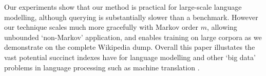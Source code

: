 Our experiments show that our method is practical for large-scale language
modelling, although querying is substantially slower than a \SRILM benchmark.
However our technique scales much more gracefully with Markov order $m$, allowing
unbounded `non-Markov' application, and enables training on large
corpora as we demonstrate on the complete Wikipedia dump.
Overall this paper illustates the vast potential succinct indexes have for language modelling  and
other `big data' problems in language processing such as machine translation 
\cite{zhang_vogel_2005,DBLP:conf/acl/Callison-BurchBS05,lopez2008,DBLP:journals/tacl/HeLL15}.



